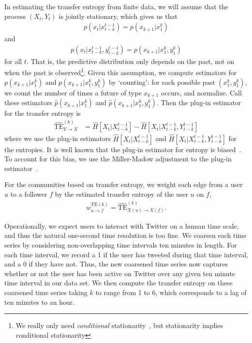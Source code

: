 In estimating the transfer entropy from finite data, we will assume that the process $(X_{t}, Y_{t})$ is jointly stationary, which gives us that
\begin{align}
	p(x_{t} | x_{t-k}^{t-1}) = p(x_{k+1} | x_{1}^{k})
\end{align}
and
\begin{align}
	p(x_{t} | x_{t-k}^{t-1}, y_{t-k}^{t-1}) = p(x_{k+1} | x_{1}^{k}, y_{1}^{k})
\end{align}
for all $t$. That is, the predictive distribution only depends on the past, not on when the past is observed\footnote{We really only need \emph{conditional} stationarity~\cite{caires2003nonparametric}, but stationarity implies conditional stationarity}. Given this assumption, we compute estimators for $p(x_{k+1} | x_{1}^{k})$ and $p(x_{k+1} | x_{1}^{k}, y_{1}^{k})$ by `counting': for each possible past $(x_{1}^{k}, y_{1}^{k})$, we count the number of times a future of type $x_{k+1}$ occurs, and normalize. Call these estimators $\hat{p}(x_{k+1} | x_{1}^{k})$ and $\hat{p}(x_{k+1} | x_{1}^{k}, y_{1}^{k})$. Then the plug-in estimator for the transfer entropy is
\begin{align}
	\widehat{\text{TE}}_{Y \to X}^{(k)} &= \hat{H}\left[X_{t} | X_{t-k}^{t-1}\right] - \hat{H}\left[X_{t} | X_{t-k}^{t-1}, Y_{t-k}^{t-1}\right]
\end{align}
where we use the plug-in estimators $\hat{H}\left[X_{t} | X_{t-k}^{t-1}\right]$ and $\hat{H}\left[X_{t} | X_{t-k}^{t-1}, Y_{t-k}^{t-1}\right]$ for the entropies. It is well known that the plug-in estimator for entropy is biased~\cite{paninski2003estimation}. To account for this bias, we use the Miller-Madow adjustment to the plug-in estimator~\cite{miller1955note}.

For the communities based on transfer entropy, we weight each edge from a user $u$ to a follower $f$ by the estimated transfer entropy of the user $u$ on $f$, 
\begin{align}
	w_{u \to f}^{\text{TE}(k)} = \widehat{\text{TE}}_{X(u) \to X(f)}^{(k)}.
\end{align}

Operationally, we expect users to interact with Twitter on a human time scale, and thus the natural one-second time resolution is too fine. We coarsen each time series by considering non-overlapping time intervals ten minutes in length. For each time interval, we record a 1 if the user has tweeted during that time interval, and a 0 if they have not. Thus, the new coarsened time series now captures whether or not the user has been active on Twitter over any given ten minute time interval in our data set. We then compute the transfer entropy on these coarsened time series taking $k$ to range from 1 to 6, which corresponds to a lag of ten minutes to an hour.

